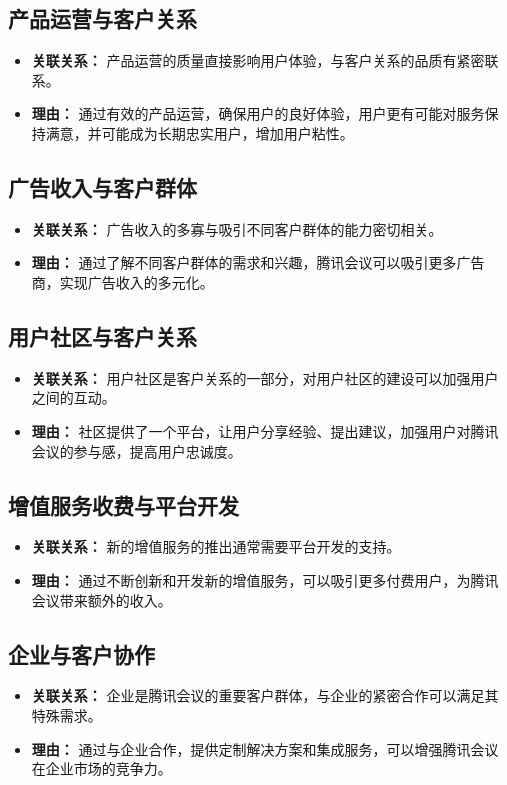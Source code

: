 \documentclass[a4paper,12pt]{article}
\begin{document}
    \subsection{产品运营与客户关系}
    \begin{itemize}
        \item\textbf{关联关系：} 产品运营的质量直接影响用户体验，与客户关系的品质有紧密联系。
        \item\textbf{理由：} 通过有效的产品运营，确保用户的良好体验，用户更有可能对服务保持满意，并可能成为长期忠实用户，增加用户粘性。
    \end{itemize}
    \subsection{广告收入与客户群体}
    \begin{itemize}
        \item\textbf{关联关系：} 广告收入的多寡与吸引不同客户群体的能力密切相关。
        \item\textbf{理由：} 通过了解不同客户群体的需求和兴趣，腾讯会议可以吸引更多广告商，实现广告收入的多元化。
    \end{itemize}
    \subsection{用户社区与客户关系}
    \begin{itemize}
        \item\textbf{关联关系：} 用户社区是客户关系的一部分，对用户社区的建设可以加强用户之间的互动。
        \item\textbf{理由：} 社区提供了一个平台，让用户分享经验、提出建议，加强用户对腾讯会议的参与感，提高用户忠诚度。
    \end{itemize}
    \subsection{增值服务收费与平台开发}
    \begin{itemize}
        \item\textbf{关联关系：} 新的增值服务的推出通常需要平台开发的支持。
        \item\textbf{理由：} 通过不断创新和开发新的增值服务，可以吸引更多付费用户，为腾讯会议带来额外的收入。
    \end{itemize}
    \subsection{企业与客户协作}
    \begin{itemize}
        \item\textbf{关联关系：} 企业是腾讯会议的重要客户群体，与企业的紧密合作可以满足其特殊需求。
        \item\textbf{理由：} 通过与企业合作，提供定制解决方案和集成服务，可以增强腾讯会议在企业市场的竞争力。
    \end{itemize}
\end{document}
